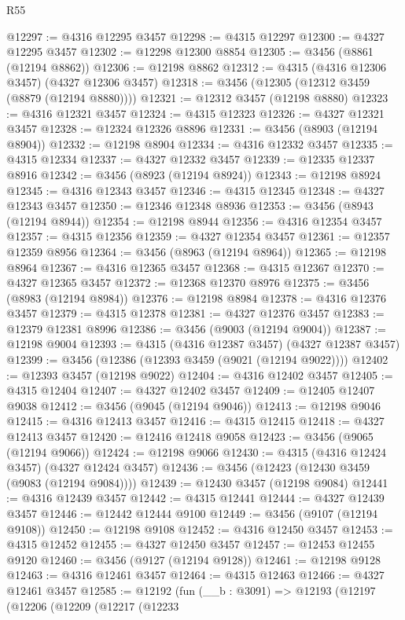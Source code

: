 \begin{lexlean}{R55}
\begin{coremodule}
@12297 := @4316 @12295 @3457
@12298 := @4315 @12297
@12300 := @4327 @12295 @3457
@12302 := @12298 @12300 @8854
@12305 := @3456 (@8861 (@12194 @8862))
@12306 := @12198 @8862
@12312 := @4315 (@4316 @12306 @3457) (@4327 @12306 @3457)
@12318 := @3456 (@12305 (@12312 @3459 (@8879 (@12194 @8880))))
@12321 := @12312 @3457 (@12198 @8880)
@12323 := @4316 @12321 @3457
@12324 := @4315 @12323
@12326 := @4327 @12321 @3457
@12328 := @12324 @12326 @8896
@12331 := @3456 (@8903 (@12194 @8904))
@12332 := @12198 @8904
@12334 := @4316 @12332 @3457
@12335 := @4315 @12334
@12337 := @4327 @12332 @3457
@12339 := @12335 @12337 @8916
@12342 := @3456 (@8923 (@12194 @8924))
@12343 := @12198 @8924
@12345 := @4316 @12343 @3457
@12346 := @4315 @12345
@12348 := @4327 @12343 @3457
@12350 := @12346 @12348 @8936
@12353 := @3456 (@8943 (@12194 @8944))
@12354 := @12198 @8944
@12356 := @4316 @12354 @3457
@12357 := @4315 @12356
@12359 := @4327 @12354 @3457
@12361 := @12357 @12359 @8956
@12364 := @3456 (@8963 (@12194 @8964))
@12365 := @12198 @8964
@12367 := @4316 @12365 @3457
@12368 := @4315 @12367
@12370 := @4327 @12365 @3457
@12372 := @12368 @12370 @8976
@12375 := @3456 (@8983 (@12194 @8984))
@12376 := @12198 @8984
@12378 := @4316 @12376 @3457
@12379 := @4315 @12378
@12381 := @4327 @12376 @3457
@12383 := @12379 @12381 @8996
@12386 := @3456 (@9003 (@12194 @9004))
@12387 := @12198 @9004
@12393 := @4315 (@4316 @12387 @3457) (@4327 @12387 @3457)
@12399 := @3456 (@12386 (@12393 @3459 (@9021 (@12194 @9022))))
@12402 := @12393 @3457 (@12198 @9022)
@12404 := @4316 @12402 @3457
@12405 := @4315 @12404
@12407 := @4327 @12402 @3457
@12409 := @12405 @12407 @9038
@12412 := @3456 (@9045 (@12194 @9046))
@12413 := @12198 @9046
@12415 := @4316 @12413 @3457
@12416 := @4315 @12415
@12418 := @4327 @12413 @3457
@12420 := @12416 @12418 @9058
@12423 := @3456 (@9065 (@12194 @9066))
@12424 := @12198 @9066
@12430 := @4315 (@4316 @12424 @3457) (@4327 @12424 @3457)
@12436 := @3456 (@12423 (@12430 @3459 (@9083 (@12194 @9084))))
@12439 := @12430 @3457 (@12198 @9084)
@12441 := @4316 @12439 @3457
@12442 := @4315 @12441
@12444 := @4327 @12439 @3457
@12446 := @12442 @12444 @9100
@12449 := @3456 (@9107 (@12194 @9108))
@12450 := @12198 @9108
@12452 := @4316 @12450 @3457
@12453 := @4315 @12452
@12455 := @4327 @12450 @3457
@12457 := @12453 @12455 @9120
@12460 := @3456 (@9127 (@12194 @9128))
@12461 := @12198 @9128
@12463 := @4316 @12461 @3457
@12464 := @4315 @12463
@12466 := @4327 @12461 @3457
@12585 := @12192
    (fun (__b : @3091) =>
    @12193
      (@12197
        (@12206
          (@12209
            (@12217
              (@12233

\end{coremodule}
\end{lexlean}
